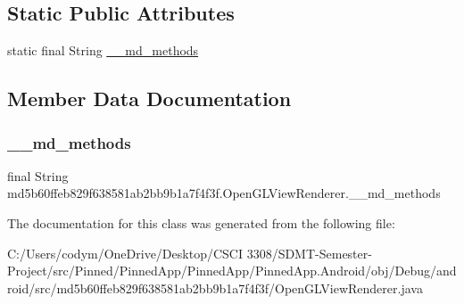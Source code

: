 \subsection*{Static Public Attributes}
\begin{DoxyCompactItemize}
\item 
static final String \hyperlink{classmd5b60ffeb829f638581ab2bb9b1a7f4f3f_1_1_open_g_l_view_renderer_a55f0f0092c5140b38cf1f7aba5594097}{\+\_\+\+\_\+md\+\_\+methods}
\end{DoxyCompactItemize}


\subsection{Member Data Documentation}
\mbox{\label{classmd5b60ffeb829f638581ab2bb9b1a7f4f3f_1_1_open_g_l_view_renderer_a55f0f0092c5140b38cf1f7aba5594097}} 
\subsubsection{\texorpdfstring{\+\_\+\+\_\+md\+\_\+methods}{\_\_md\_methods}}
{\footnotesize\ttfamily final String md5b60ffeb829f638581ab2bb9b1a7f4f3f.\+Open\+G\+L\+View\+Renderer.\+\_\+\+\_\+md\+\_\+methods\hspace{0.3cm}{\ttfamily [static]}}



The documentation for this class was generated from the following file\+:\begin{DoxyCompactItemize}
\item 
C\+:/\+Users/codym/\+One\+Drive/\+Desktop/\+C\+S\+C\+I 3308/\+S\+D\+M\+T-\/\+Semester-\/\+Project/src/\+Pinned/\+Pinned\+App/\+Pinned\+App/\+Pinned\+App.\+Android/obj/\+Debug/android/src/md5b60ffeb829f638581ab2bb9b1a7f4f3f/Open\+G\+L\+View\+Renderer.\+java\end{DoxyCompactItemize}
